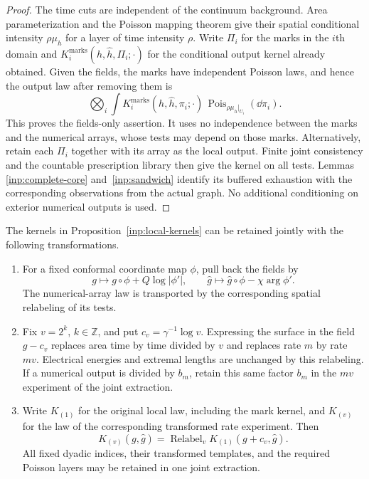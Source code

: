 \begin{proof}
The time cuts are independent of the continuum background.
Area parameterization and the Poisson
mapping theorem give their spatial conditional intensity
$\rho\mu_h$ for a layer of time intensity $\rho$.
Write $\Pi_i$ for the marks in the $i$th domain and
$K_i^{\mathrm{marks}}(h,\widehat h,\Pi_i;\cdot)$ for the
conditional output kernel already obtained.  Given the fields,
the marks have independent Poisson laws, and hence the output
law after removing them is
\[
 \bigotimes_i\int K_i^{\mathrm{marks}}
       (h,\widehat h,\pi_i;\cdot)\,
             \operatorname{Pois}_{\rho\mu_h|_{U_i}}(\dd\pi_i).
\]
This proves the fields-only assertion.  It uses no independence
between the marks and the numerical arrays, whose tests may
depend on those marks.  Alternatively, retain each $\Pi_i$
together with its array as the local output.
Finite joint consistency and the countable prescription library
then give the kernel on all tests.  Lemmas
\ref{inp:complete-core} and~\ref{inp:sandwich} identify its
buffered exhaustion with the corresponding observations from
the actual graph.  No additional conditioning on exterior
numerical outputs is used.
\end{proof}

\begin{proposition}\label{inp:transport}
The kernels in Proposition~\ref{inp:local-kernels} can be retained
jointly with the following transformations.
\begin{enumerate}
\item For a fixed conformal coordinate map $\phi$, pull back the
fields by
\[
 g\longmapsto g\circ\phi+Q\log|\phi'|,
 \qquad
 \widehat g\longmapsto\widehat g\circ\phi-\chi\arg\phi'.
\]
The numerical-array law is transported by the corresponding
spatial relabeling of its tests.
\item Fix $v=2^k$, $k\in\mathbb Z$, and put
$c_v=\gamma^{-1}\log v$.  Expressing the surface in the field
$g-c_v$ replaces area time by time divided by $v$ and replaces
rate $m$ by rate $mv$.  Electrical energies and extremal lengths
are unchanged by this relabeling.  If a numerical output is
divided by $b_m$, retain this same factor $b_m$ in the $mv$
experiment of the joint extraction.
\item Write $K_{(1)}$ for the original local law, including the
mark kernel, and $K_{(v)}$ for the law of the corresponding
transformed rate experiment.  Then
\begin{equation}\label{inp:unit-kernel}
 K_{(v)}(g,\widehat g)
     =\operatorname{Relabel}_v K_{(1)}(g+c_v,\widehat g).
\end{equation}
All fixed dyadic indices, their transformed templates, and the
required Poisson layers may be retained in one joint extraction.
\end{enumerate}
\end{proposition}

